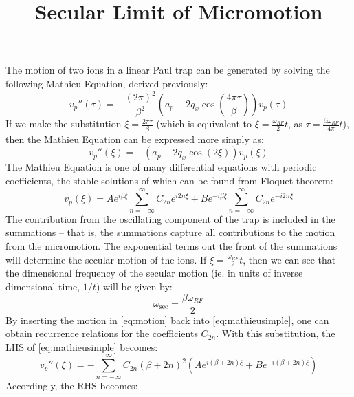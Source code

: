 \documentclass{article}
\title{Secular Limit of Micromotion}
\begin{document}
\maketitle
\noindent The motion of two ions in a linear Paul trap can be generated by solving the following Mathieu Equation, derived previously:
\begin{equation}
v_p''(\tau) = - \frac{(2 \pi)^2}{\beta^2} \left( a_p - 2 q_x \cos \left( \frac{4 \pi \tau}{\beta} \right) \right) v_p (\tau)	
\label{eq:mathieu}
\end{equation}
If we make the substitution $\xi = \frac{2 \pi \tau}{\beta}$ (which is equivalent to $\xi = \frac{\omega_{RF}}{2} t$, as $\tau = \frac{\beta \omega_{RF}}{4 \pi} t$), then the Mathieu Equation can be expressed more simply as:
\begin{equation}
v_p''(\xi)	= - \left( a_p - 2 q_x \cos \left( 2 \xi \right) \right) v_p (\xi)
\label{eq:mathieusimple}
\end{equation}
The Mathieu Equation is one of many differential equations with periodic coefficients, the stable solutions of which can be found from Floquet theorem:
\begin{equation}
	v_p (\xi) = A e^{i \beta \xi} \sum_{n = - \infty}^{\infty} C_{2n} e^{i 2 n \xi} + B e^{- i \beta \xi} \sum_{n = - \infty}^{\infty} C_{2n} e^{- i 2 n \xi}
	\label{eq:motion}
\end{equation}
The contribution from the oscillating component of the trap is included in the summations -- that is, the summations capture all contributions to the motion from the micromotion. The exponential terms out the front of the summations will determine the secular motion of the ions. 
If $\xi = \frac{\omega_{RF}}{2} t$, then we can see that the dimensional frequency of the secular motion (ie. in units of inverse dimensional time, $1/t$) will be given by:
\begin{equation}
\omega_{\text{sec}} = \frac{\beta \omega_{RF}}{2} \label{eq:sec}
\end{equation}
By inserting the motion in \eqref{eq:motion} back into \eqref{eq:mathieusimple}, one can obtain recurrence relations for the coefficients $C_{2n}$. With this substitution, the LHS of \eqref{eq:mathieusimple} becomes:
\begin{equation*}
v_p'' (\xi) = - \sum_{n = - \infty}^{\infty} C_{2n} (\beta + 2n)^2 (A e^{i (\beta + 2n) \xi} + B e^{-i (\beta + 2n) \xi} )
\end{equation*}
Accordingly, the RHS becomes:
\end{document}
